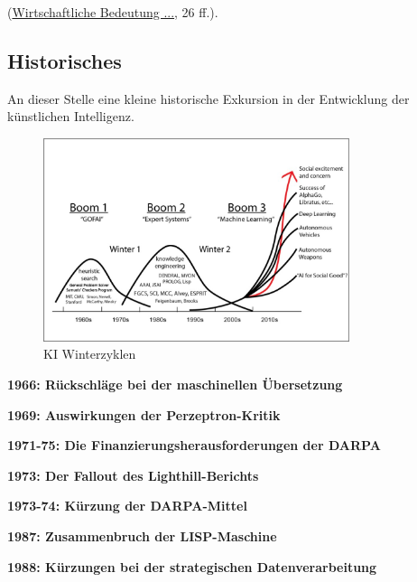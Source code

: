 (\href{https://www.bitkom.org/sites/main/files/file/import/171012-KI-Gipfelpapier-online.pdf}{Wirtschaftliche Bedeutung ...}, 26 ff.).

\subsection{Historisches}

An dieser Stelle eine kleine historische Exkursion in der Entwicklung der künstlichen Intelligenz.\vspace{0.2cm}

\begin{figure}[!ht]
	\includegraphics[width=0.8\textwidth]{content/chapter_basics/images/ai-winter-cycles.jpg}
	\centering
	\caption{KI Winterzyklen}
	\label{img:ai_winter_cycles}
\end{figure}

\textbf{1966: Rückschläge bei der maschinellen Übersetzung}\vspace{0.2cm}

\textbf{1969: Auswirkungen der Perzeptron-Kritik}\vspace{0.2cm}

\textbf{1971-75: Die Finanzierungsherausforderungen der DARPA}\vspace{0.2cm}

\textbf{1973: Der Fallout des Lighthill-Berichts}\vspace{0.2cm}

\textbf{1973-74: Kürzung der DARPA-Mittel}\vspace{0.2cm}

\textbf{1987: Zusammenbruch der LISP-Maschine}\vspace{0.2cm}

\textbf{1988: Kürzungen bei der strategischen Datenverarbeitung}\vspace{0.2cm}


